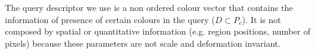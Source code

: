 The query descriptor we use is a non ordered colour vector that contains the information of presence of certain colours in the query ($D \subset P_c$). It is not composed by spatial or quantitative information (e.g. region positions, number of pixels) because these parameters are not scale and deformation invariant.%



